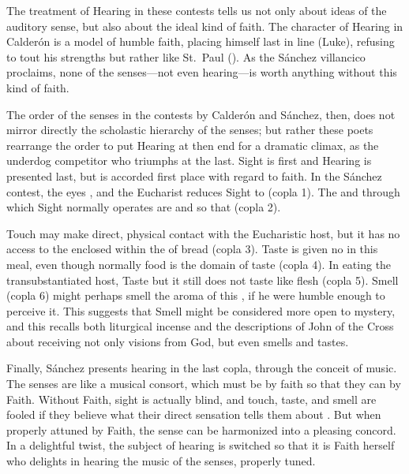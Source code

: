 The treatment of Hearing in these contests tells us not only about ideas of the auditory sense, but also about the ideal kind of faith.
The character of Hearing in Calderón is a model of humble faith, placing himself last in line (Luke), refusing to tout his strengths but rather  like St.\ Paul ().
As the Sánchez villancico proclaims, none of the senses---not even hearing---is worth anything without this kind of faith.

The order of the senses in the contests by Calderón and Sánchez, then, does not mirror directly the scholastic hierarchy of the senses; but rather these poets rearrange the order to put Hearing at then end for a dramatic climax, as the underdog competitor who triumphs at the last.
Sight is first and Hearing is presented last, but is accorded first place with regard to faith.
In the Sánchez contest, the eyes , and the Eucharist reduces Sight to  (copla 1).
The  and  through which Sight normally operates are   and  so that  (copla 2).

Touch may make direct, physical contact with the Eucharistic host, but it has no access to the  enclosed within the  of bread (copla 3).
Taste is given no  in this meal, even though normally food is the domain of taste (copla 4).
In eating the transubstantiated host, Taste  but it still does not taste like flesh (copla 5).
Smell (copla 6) might perhaps smell the aroma of this , if he were humble enough to perceive it.
This suggests that Smell might be considered more open to mystery, and this recalls both liturgical incense and the descriptions of John of the Cross about receiving not only visions from God, but even smells and tastes.

Finally, Sánchez presents hearing in the last copla, through the conceit of music.
The senses are  like a musical consort, which must be  by faith so that they can  by Faith.
Without Faith, sight is actually blind, and touch, taste, and smell are fooled if they believe what their direct sensation tells them about .
But when properly attuned by Faith, the sense can be harmonized into a pleasing concord.
In a delightful twist, the subject of hearing is switched so that it is Faith herself who delights in hearing the music of the senses, properly tuned. 

